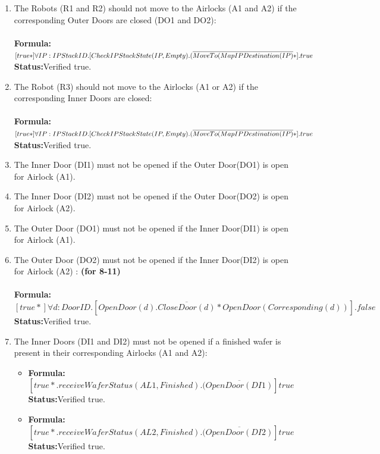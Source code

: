 \documentclass[a4paper,12pt]{article}
\begin{document}
\begin{enumerate}


\item The Robots (R1 and R2) should not move to the Airlocks (A1 and A2) if the corresponding Outer Doors are closed (DO1 and DO2):
\\
\\\textbf{Formula:} $[true*] \forall IP: IPStackID.[CheckIPStackState(IP, Empty).
\\(\overline{MoveTo(MapIPDestination(IP)}*].true$ \\\textbf{Status:}Verified true.


\item The Robot (R3) should not move to the Airlocks (A1 or A2) if the corresponding Inner Doors are closed:
\\
\\\textbf{Formula:} $[true*] \forall IP: IPStackID.[CheckIPStackState(IP, Empty).
\\(\overline{MoveTo(MapIPDestination(IP)}*].true$ \\\textbf{Status:}Verified true.


\item The Inner Door (DI1) must not be opened if the Outer Door(DO1) is open for Airlock (A1).


\item The Inner Door (DI2) must not be opened if the Outer Door(DO2) is open for Airlock (A2).


\item The Outer Door (DO1) must not be opened if the Inner Door(DI1) is open for Airlock (A1).


\item The Outer Door (DO2) must not be opened if the Inner Door(DI2) is open for Airlock (A2) : \textbf{(for 8-11)} 
\\
\\\textbf{Formula:} $[true*] \forall d: DoorID.[OpenDoor(d).\overline{CloseDoor(d)}*OpenDoor(Corresponding(d))].false$ \\\textbf{Status:}Verified true.


\item The Inner Doors (DI1 and DI2) must not be opened if a finished wafer is present in their corresponding Airlocks (A1 and A2):
    \begin{itemize}
	\item \textbf{Formula:} $[true*.receiveWaferStatus(AL1,Finished).(\overline{OpenDoor(DI1)}]true$ 
	\\\textbf{Status:}Verified true.
    \item \textbf{Formula:} $[true*.receiveWaferStatus(AL2,Finished).(\overline{OpenDoor(DI2)}]true$  
    \\\textbf{Status:}Verified true.
	\end{itemize}



\end{enumerate}
\end{document}
